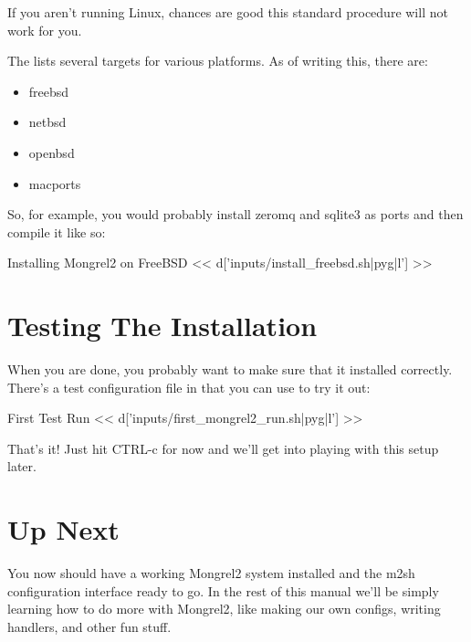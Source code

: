 If you aren't running Linux, chances are good this standard procedure will not work for you.

The  lists several targets for various platforms. As of writing this, there are:

\begin{itemize}
\item freebsd
\item netbsd
\item openbsd
\item macports
\end{itemize}

So, for example, you would probably install zeromq and sqlite3 as ports and then compile it like so:

\begin{code}{Installing Mongrel2 on FreeBSD}
<< d['inputs/install_freebsd.sh|pyg|l'] >>
\end{code}

\section{Testing The Installation}

When you are done, you probably want to make sure that it installed correctly.
There's a test configuration file in  that you can
use to try it out:

\begin{code}{First Test Run}
<< d['inputs/first_mongrel2_run.sh|pyg|l'] >>
\end{code}

That's it!  Just hit CTRL-c for now and we'll get into playing with this
setup later.



\section{Up Next}

You now should have a working Mongrel2 system installed and the m2sh configuration
interface ready to go.  In the rest of this manual we'll be simply learning how
to do more with Mongrel2, like making our own configs, writing handlers, and other
fun stuff.

